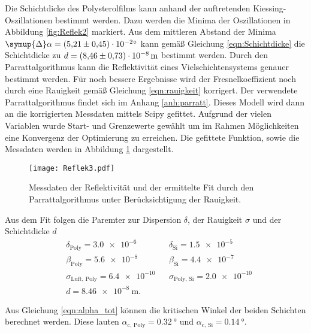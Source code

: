 Die Schichtdicke des Polysterolfilms kann anhand der auftretenden Kiessing-Oszillationen bestimmt werden. Dazu werden die Minima der Oszillationen in Abbildung \ref{fig:Reflek2}
markiert. Aus dem mittleren Abstand der Minima $\symup{\Delta}\alpha = \qty{5.21 +- 0.45e-2}{\degree}$ kann gemäß Gleichung \ref{eqn:Schichtdicke} die Schichtdicke zu 
$d = \qty{8.46 +- 0.73e-8}{\metre}$ bestimmt werden.
Durch den Parrattalgorithmus kann die Reflektivität eines Vielschichtensystems genauer bestimmt werden. Für noch bessere Ergebnisse wird der Fresnelkoeffizient noch durch eine 
Rauigkeit gemäß Gleichung \ref{eqn:rauigkeit} korrigert. Der verwendete Parrattalgorithmus findet sich im Anhang \ref{anh:parratt}. Dieses Modell wird dann an die korrigierten
Messdaten mittels Scipy \cite{scipy} gefittet. Aufgrund der vielen Variablen wurde Start- und Grenzewerte gewählt um im Rahmen Möglichkeiten eine Konvergenz der Optimierung 
zu erreichen. Die gefittete Funktion, sowie die Messdaten werden in Abbildung \ref{fig:Reflek3} dargestellt.
\begin{figure}
    \centering
    \texttt{[image: Reflek3.pdf]}
    \caption{Messdaten der Reflektivität und der ermittelte Fit durch den Parrattalgorithmus unter Berücksichtigung der Rauigkeit.}
    \label{fig:Reflek3}
\end{figure}
Aus dem Fit folgen die Paremter zur Dispersion $\delta$, der Rauigkeit $\sigma$ und der Schichtdicke $d$
\begin{align*}
    &\delta_\text{Poly} = \num{3.0e-6} & &\delta_\text{Si} = \num{1.5e-5} \\
    &\beta_\text{Poly} = \num{5.6e-8} & &\beta_\text{Si} = \num{4.4e-7} \\
    &\sigma_\text{Luft, Poly} = \num{6.4e-10} & &\sigma_\text{Poly, Si} = \num{2.0e-10} \\
    &d = \qty{8.46e-8}{\metre}.
  \end{align*}

Aus Gleichung \ref{eqn:alpha_tot} können die kritischen Winkel der beiden Schichten berechnet werden. Diese lauten $\alpha_\text{c, Poly} = \qty{0.32}{\degree}$ und $\alpha_\text{c, Si} = \qty{0.14}{\degree}$.